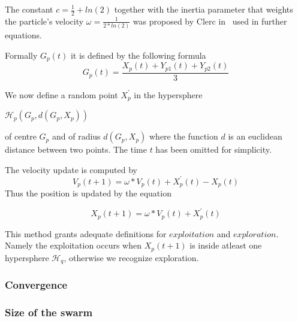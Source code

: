 \documentclass[runningheads,a4paper]{llncs}
\begin{document}
The constant $c = \frac{1}{2} + ln(2)$ together with the inertia parameter that weights the particle's velocity $\omega = \frac{1}{2 * ln(2)}$ was proposed by Clerc in~\cite{pso_anal}  used in further equations. 

Formally $G_p(t)$ it is defined by the following formula 
\begin{equation}
	G_p(t) = \frac{X_p(t) + Y_{p1}(t) + Y_{p2}(t)} {3}
\end{equation}

We now define a random point $X^{'}_p$ in the hypersphere
\begin{center}
	$\mathcal{H}_p(G_p, d(G_p, X_p))$ 
\end{center}
of centre $G_p$ and of radius $d(G_p, X_p)$ where the function $d$ is an euclidean distance between two points. The time $t$ has been omitted for simplicity.

The velocity update is computed by
\begin{equation}
	V_p(t+1) = \omega * V_p(t) + X^{'}_p(t) - X_p(t)
\end{equation}
Thus the position is updated by the equation

\begin{equation}
	X_p(t+1) = \omega * V_p(t) + X^{'}_p(t)
\end{equation}

This method grants adequate definitions for $exploitation$ and $exploration$. Namely the exploitation occurs when $X_p(t+1)$ is inside atleast one hypersphere $\mathcal{H}_q$, otherwise we recognize exploration.

\subsubsection{Convergence}


\subsubsection{Size of the swarm}
\end{document}
